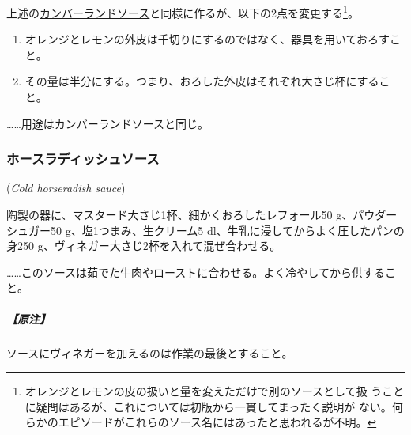 \begin{recette}
上述の\protect\hyperlink{cumberland-sauce}{カンバーランドソース}と同様に作るが、以下の2点を変更する\footnote{オレンジとレモンの皮の扱いと量を変えただけで別のソースとして扱
  うことに疑問はあるが、これについては初版から一貫してまったく説明が
  ない。何らかのエピソードがこれらのソース名にはあったと思われるが不明。}。

\begin{enumerate}
\def\labelenumi{\arabic{enumi}.}
\item
  オレンジとレモンの外皮は千切りにするのではなく、器具を用いておろすこと。
\item
  その量は半分にする。つまり、おろした外皮はそれぞれ大さじ\undemi{}杯にすること。
\end{enumerate}

\ldots{}\ldots{}用途はカンバーランドソースと同じ。

\maeaki

\hypertarget{cold-horseradish-sauce}{%
\subsubsection{ホースラディッシュソース}\label{cold-horseradish-sauce}}

 (\emph{Cold horseradish sauce})


陶製の器に、マスタード大さじ1杯、細かくおろしたレフォール50
g、パウダーシュガー50 g、塩1つまみ、生クリーム5
dl、牛乳に浸してからよく圧したパンの身250
g、ヴィネガー大さじ2杯を入れて混ぜ合わせる。

\ldots{}\ldots{}このソースは茹でた牛肉やローストに合わせる。よく冷やしてから供すること。

\hypertarget{ux539fux6ce8-2}{%
\subparagraph{【原注】}\label{ux539fux6ce8-2}}

ソースにヴィネガーを加えるのは作業の最後とすること。
\end{recette}